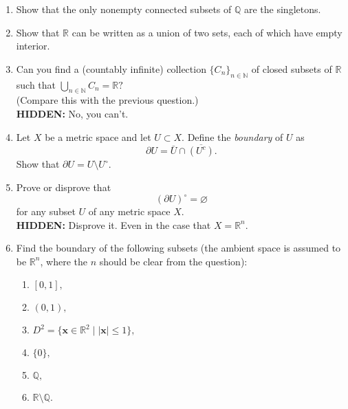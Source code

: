 \documentclass[12pt]{article}
\theoremstyle{definition}
\numberwithin{thm}{section}
\let\emptyset\varnothing
\newcommand{\hint}[1]{\textbf{HIDDEN:} {\color[rgb]{0.95, 0.95, 0.95}#1}}
\begin{document}
\begin{enumerate}
\begin{enumerate}
		\item Give an example of a compact subset of $\mathbb{Q}$ which is not connected.\\
		\hint{One such is $\{0\} \cup \left\{n^{-1} : n \in \mathbb{N}\right\}.$}
		\item Can you give an example of a connected subset of $\mathbb{Q}$ which is not compact?\\
		\hint{The next question might be helpful.}
	\end{enumerate}
	\item Show that the only nonempty connected subsets of $\mathbb{Q}$ are the singletons.
	\item Show that $\mathbb{R}$ can be written as a union of two sets, each of which have empty interior.
	\item Can you find a (countably infinite) collection $\{C_n\}_{n \in \mathbb{N}}$ of closed subsets of $\mathbb{R}$ such that $\displaystyle\bigcup_{n \in \mathbb{N}}C_n = \mathbb{R}?$\\
	(Compare this with the previous question.)\\
	\hint{No, you can't.}
	\item Let $X$ be a metric space and let $U \subset X.$ Define the \emph{boundary} of $U$ as 
	\begin{equation*} 
		\partial U = \bar{U} \cap \overline{(U^c)}.
	\end{equation*}
	Show that $\partial U = U \setminus U^\circ.$
	\item Prove or disprove that
	\begin{equation*} 
		(\partial U)^\circ = \emptyset
	\end{equation*}
	for any subset $U$ of any metric space $X.$\\
	\hint{Disprove it. Even in the case that $X = \mathbb{R}^n.$}
	\item Find the boundary of the following subsets (the ambient space is assumed to be $\mathbb{R}^n$, where the $n$ should be clear from the question):
	\begin{enumerate}
		\item $[0, 1],$
		\item $(0, 1),$
		\item $D^2 = \{\mathbf{x} \in \mathbb{R}^2 \mid \left|\mathbf{x}\right| \le 1\},$
		\item $\{0\},$
		\item $\mathbb{Q},$
		\item $\mathbb{R}\setminus\mathbb{Q}.$
	\end{enumerate}

\end{enumerate}
\end{document}
